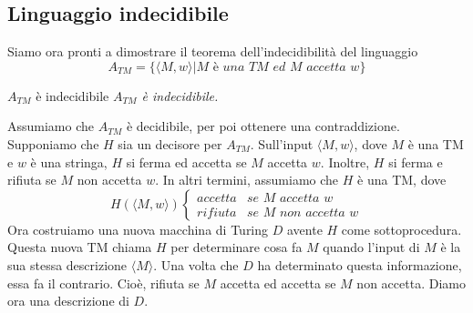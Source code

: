 \subsection{Linguaggio indecidibile}
Siamo ora pronti a dimostrare il teorema dell'indecidibilità del linguaggio
\begin{equation*}
A_{TM}=\{\langle M,w\rangle | M\textit{ è una TM ed M accetta }w\}
\end{equation*}

\begin{Thm}{$A_{TM}$ è indecidibile}{}
\textit{$A_{TM}$ è indecidibile.}

\begin{demonstration}
Assumiamo che $A_{TM}$ è decidibile, per poi ottenere una contraddizione. Supponiamo che $H$ sia un decisore per $A_{TM}$. Sull'input $\langle M,w\rangle$, dove $M$ è una TM e $w$ è una stringa, $H$ si ferma ed accetta se $M$ accetta $w$. Inoltre, $H$ si ferma e rifiuta se $M$ non accetta $w$. In altri termini, assumiamo che $H$ è una TM, dove
\begin{equation*}H(\langle M, w\rangle)
\begin{cases}
accetta& \textit{se }M\textit{ accetta }w\\rifiuta& \textit{se }M\textit{ non accetta }w
\end{cases}
\end{equation*}
Ora costruiamo una nuova macchina di Turing $D$ avente $H$ come sottoprocedura. Questa nuova TM chiama $H$ per determinare cosa fa $M$ quando l'input di $M$ è la sua stessa descrizione $\langle M\rangle$. Una volta che $D$ ha determinato questa informazione, essa fa il contrario. Cioè, rifiuta se $M$ accetta ed accetta se $M$ non accetta. Diamo ora una descrizione di $D$.


\end{demonstration}
\end{Thm}
